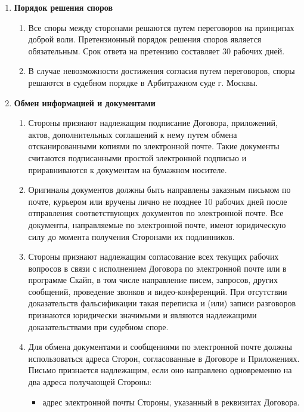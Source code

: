 \documentclass[14pt,a4paper]{article}
\begin{document}
\begin{enumerate}
	\item
	\begin{center}
	\textbf{Порядок решения споров}
	\end{center}
	\begin{enumerate}
		\item Все споры между сторонами решаются путем переговоров на принципах доброй воли. Претензионный порядок решения споров является обязательным. Срок ответа на претензию составляет 30 рабочих дней.

		\item В случае невозможности достижения согласия путем переговоров, споры решаются в судебном порядке в Арбитражном суде г. Москвы.
	\end{enumerate}

	\item
	\begin{center}
	\textbf{Обмен информацией и документами}
	\end{center}
	\begin{enumerate}
		\item Стороны признают надлежащим подписание Договора, приложений, актов, дополнительных соглашений к нему путем обмена отсканированными копиями по электронной почте. Такие документы считаются подписанными простой электронной подписью и приравниваются к документам на бумажном носителе.

		\item Оригиналы документов должны быть направлены заказным письмом по почте, курьером или вручены лично не позднее 10 рабочих дней после отправления соответствующих документов по электронной почте. Все документы, направляемые по электронной почте, имеют юридическую силу до момента получения Сторонами их подлинников.

		\item Стороны признают надлежащим согласование всех текущих рабочих вопросов в связи с исполнением Договора по электронной почте или в программе Скайп, в том числе направление писем, запросов, других сообщений, проведение звонков и видео-конференций. При отсутствии доказательств фальсификации такая переписка и (или) записи разговоров признаются юридически значимыми и являются надлежащими доказательствами при судебном споре.

		\item Для обмена документами и сообщениями по электронной почте должны использоваться адреса Сторон, согласованные в Договоре и Приложениях. Письмо признается надлежащим, если оно направлено одновременно на два адреса получающей Стороны:
		\begin{itemize}
			\item адрес электронной почты Стороны, указанный в реквизитах Договора.


\end{itemize}
\end{enumerate}
\end{enumerate}
\end{document}
